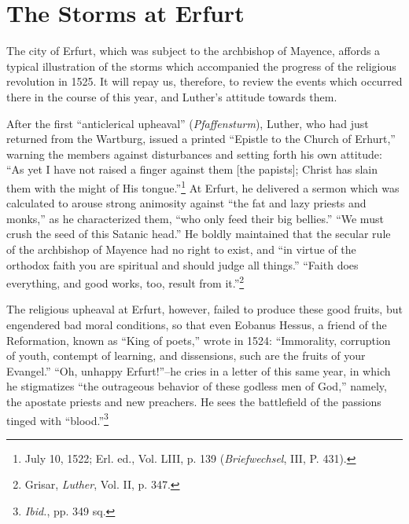 \section{The Storms at Erfurt}

The city of Erfurt, which was subject to the archbishop of Mayence, affords
a typical illustration of the storms which accompanied
the progress of the religious revolution in 1525. It will repay us, therefore,
to review the events which occurred there in the course of this
year, and Luther’s attitude towards them.

After the first “anticlerical upheaval” (\textit{Pfaffensturm}), Luther,
who had just returned from the Wartburg, issued a printed ``Epistle
to the Church of Erhurt,'' warning the members against disturbances
and setting forth his own attitude: “As yet I have not raised a finger
against them [the papists]; Christ has slain them with the might
of His tongue.”\footnote
{July 10, 1522; Erl. ed., Vol. LIII, p. 139 (\textit{Briefwechsel}, III, P. 431).}
At Erfurt, he delivered a sermon which was
calculated to arouse strong animosity against “the fat and lazy
priests and monks,” as he characterized them, “who only feed their
big bellies.” “We must crush the seed of this Satanic head.” He
boldly maintained that the secular rule of the archbishop of Mayence
had no right to exist, and “in virtue of the orthodox faith you are
spiritual and should judge all things.” “Faith does everything, and
good works, too, result from it.”\footnote{Grisar, \textit{Luther}, Vol. II, p. 347.}

The religious upheaval at Erfurt, however, failed to produce these
good fruits, but engendered bad moral conditions, so that even
Eobanus Hessus, a friend of the Reformation, known as “King
of poets,” wrote in 1524: “Immorality, corruption of youth, contempt of
learning, and dissensions, such are the fruits of your
Evangel.” “Oh, unhappy Erfurt!”--he cries in a letter of this same
year, in which he stigmatizes “the outrageous behavior of these godless
men of God,” namely, the apostate priests and new preachers.
He sees the battlefield of the passions tinged with “blood.”\footnote
{\textit{Ibid.}, pp. 349 sq.}

